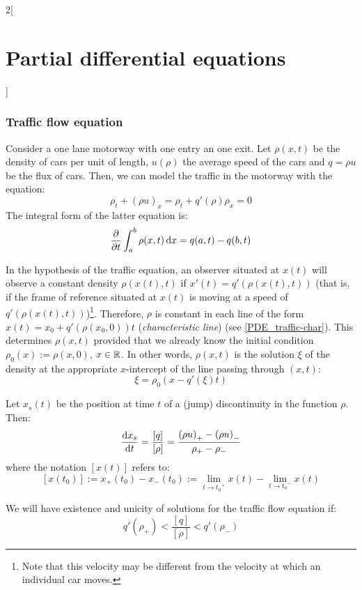 \documentclass[../../../main_math.tex]{subfiles}
\begin{document}
\begin{multicols}{2}[\section{Partial differential equations}]
  \subsubsection{Traffic flow equation}
  \begin{proposition}
    Consider a one lane motorway with one entry an one exit. Let $\rho(x,t)$ be the density of cars per unit of length, $u(\rho)$ the average speed of the cars and $q=\rho u$ be the flux of cars. Then, we can model the traffic in the motorway with the equation: $$\rho_t+{(\rho u)}_x=\rho_t+q'(\rho){\rho}_x=0$$
    The integral form of the latter equation is: $$\pdv{}{t}\int_{a}^b\rho(x,t)\dd{x}=q(a,t)-q(b,t)$$
  \end{proposition}
  \begin{proposition}
    In the hypothesis of the traffic equation, an observer situated at $x(t)$ will observe a constant density $\rho(x(t),t)$ if $x'(t)=q'(\rho(x(t),t))$ (that is, if the frame of reference situated at $x(t)$ is moving at a speed of $q'(\rho(x(t),t))$)\footnote{Note that this
      velocity may be different from the velocity at which an individual car moves.}. Therefore, $\rho$ is constant in each line of the form $x(t)=x_0+q'(\rho(x_0,0))t$ (\emph{characteristic line}) (see \cref{PDE_traffic-char}). This determines $\rho(x,t)$ provided that we already know the initial condition $\rho_0(x):=\rho(x,0)$, $x\in\mathbb{R}$. In other words, $\rho(x,t)$ is the solution $\xi$ of the density at the appropriate $x$-intercept of the line passing through $(x,t)$: $$\xi=\rho_0(x-q'(\xi)t)$$
  \end{proposition}
  \begin{center}
    \begin{minipage}{\linewidth}
      \centering
      
      \label{PDE_traffic-char}
    \end{minipage}
  \end{center}
  \begin{proposition}
    Let $x_s(t)$ be the position at time $t$ of a (jump) discontinuity in the function $\rho$. Then: $$\dv{x_s}{t}=\frac{[q]}{[\rho]}=\frac{{(\rho u)}_+-{(\rho u)}_-}{\rho_+-\rho_-}$$ where the notation $[x(t)]$ refers to: $$[x(t_0)]:=x_+(t_0)-x_-(t_0):=\lim_{t\to{t_0}^+}x(t)-\lim_{t\to{t_0}^-}x(t)$$
  \end{proposition}
  \begin{lemma}
    We will have existence and unicity of solutions for the traffic flow equation if: $$q'(\rho_+)<\frac{[q]}{[\rho]}<q'(\rho_-)$$
  \end{lemma}

\end{multicols}
\end{document}
